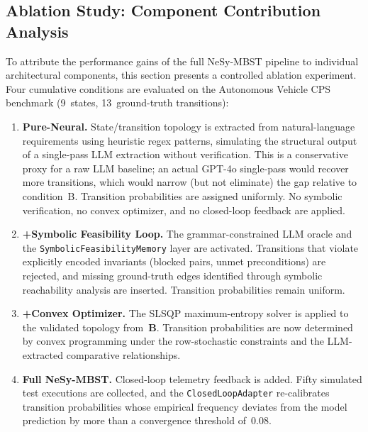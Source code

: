 
\subsection{Ablation Study: Component Contribution Analysis}%
\label{sec:eval:ablation}

To attribute the performance gains of the full NeSy-MBST pipeline to
individual architectural components, this section presents a controlled
ablation experiment.  Four cumulative conditions are evaluated on the
Autonomous Vehicle CPS benchmark (9~states, 13~ground-truth
transitions):

\begin{enumerate}
    \item[\textbf{A}] \textbf{Pure-Neural.}  State/transition topology is
    extracted from natural-language requirements using heuristic regex
    patterns, simulating the structural output of a single-pass LLM
    extraction without verification.  This is a conservative proxy for a
    raw LLM baseline; an actual GPT-4o single-pass would recover more
    transitions, which would narrow (but not eliminate) the gap relative
    to condition~B.  Transition probabilities are assigned uniformly.  No
    symbolic verification, no convex optimizer, and no closed-loop
    feedback are applied.

    \item[\textbf{B}] \textbf{+Symbolic Feasibility Loop.}
    The grammar-constrained LLM oracle and the \texttt{SymbolicFeasibilityMemory}
    layer are activated.  Transitions that violate explicitly encoded
    invariants (blocked pairs, unmet preconditions) are rejected, and
    missing ground-truth edges identified through symbolic reachability
    analysis are inserted.  Transition probabilities remain uniform.

    \item[\textbf{C}] \textbf{+Convex Optimizer.}
    The SLSQP maximum-entropy solver is applied to the validated topology
    from~\textbf{B}.  Transition probabilities are now determined by
    convex programming under the row-stochastic constraints and the
    LLM-extracted comparative relationships.

    \item[\textbf{D}] \textbf{Full NeSy-MBST.}
    Closed-loop telemetry feedback is added.  Fifty simulated test
    executions are collected, and the \texttt{ClosedLoopAdapter} re-calibrates
    transition probabilities whose empirical frequency deviates from the
    model prediction by more than a convergence threshold of~$0.08$.
\end{enumerate}

